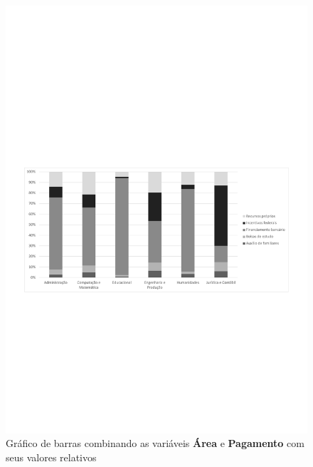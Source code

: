 \documentclass[10pt,a4paper,oneside]{article}
\begin{document}
\begin{figure}[!h]
	\includegraphics[width=\linewidth]{plots/q20b.pdf}
	\caption{Gráfico de barras combinando as variáveis \textbf{Área} e \textbf{Pagamento} com seus valores relativos}
	\label{fig:q20b}
\end{figure}
\end{document}
